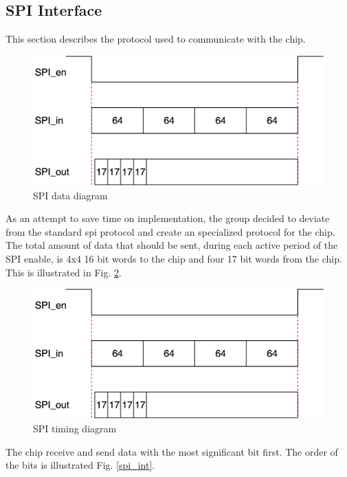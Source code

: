 
 \newpage
\subsection{SPI Interface}
This section describes the protocol used to communicate with the chip.

\begin{figure}[H]
\centering
\captionsetup{justification=centering}
\includegraphics[scale=0.35]{../figures/spi_data.png}
\caption{SPI data diagram}
\label{data}
\end{figure}

As an attempt to save time on implementation, the group decided to deviate from the standard spi protocol and create an specialized protocol for the chip.\\
The total amount of data that should be sent, during each active period of the SPI enable, is 4x4 16 bit words to the chip and four 17 bit words from the chip. This is illustrated in Fig. \ref{spi_data}.

\begin{figure}[H]
\centering
\captionsetup{justification=centering}
\includegraphics[scale=0.35]{../figures/spi_data.png}
\caption{SPI timing diagram}
\label{spi_data}
\end{figure}

The chip receive and send data with the most significant bit first. The order of the bits is illustrated Fig. \ref{spi_int}. \\


